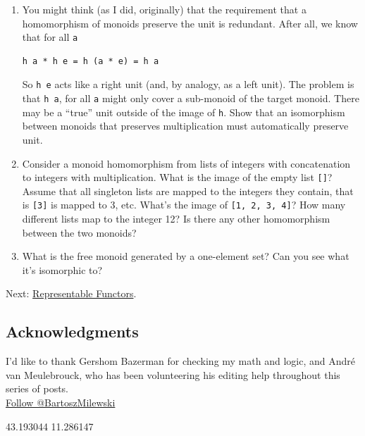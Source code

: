 \begin{enumerate}
\item
  You might think (as I did, originally) that the requirement that a
  homomorphism of monoids preserve the unit is redundant. After all, we
  know that for all \texttt{a}

\begin{verbatim}
h a * h e = h (a * e) = h a
\end{verbatim}

  So \texttt{h\ e} acts like a right unit (and, by analogy, as a left
  unit). The problem is that \texttt{h\ a}, for all \texttt{a} might
  only cover a sub-monoid of the target monoid. There may be a ``true''
  unit outside of the image of \texttt{h}. Show that an isomorphism
  between monoids that preserves multiplication must automatically
  preserve unit.
\item
  Consider a monoid homomorphism from lists of integers with
  concatenation to integers with multiplication. What is the image of
  the empty list \texttt{{[}{]}}? Assume that all singleton lists are
  mapped to the integers they contain, that is \texttt{{[}3{]}} is
  mapped to 3, etc. What's the image of \texttt{{[}1,\ 2,\ 3,\ 4{]}}?
  How many different lists map to the integer 12? Is there any other
  homomorphism between the two monoids?
\item
  What is the free monoid generated by a one-element set? Can you see
  what it's isomorphic to?
\end{enumerate}

Next:
\href{https://bartoszmilewski.com/2015/07/29/representable-functors/}{Representable
Functors}.

\subsection{Acknowledgments}\label{acknowledgments}

I'd like to thank Gershom Bazerman for checking my math and logic, and
André van Meulebrouck, who has been volunteering his editing help
throughout this series of posts.\\
\href{https://twitter.com/BartoszMilewski}{Follow @BartoszMilewski}

{43.193044} {11.286147}

